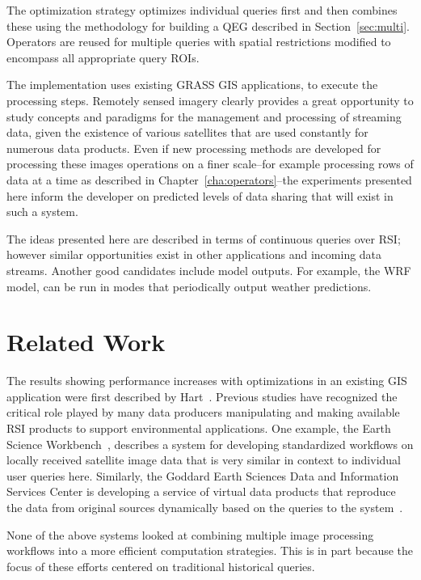 \documentclass{ucdthesis}       %
\begin{document}
The optimization strategy optimizes individual queries first and then
combines these using the methodology for building a \ac{QEG}
described in Section~\ref{sec:multi}.  Operators are reused for
multiple queries with spatial restrictions modified to encompass all
appropriate query \acp{ROI}.

The implementation uses existing \ac{GRASS} \ac{GIS} applications, to
execute the processing steps.  Remotely sensed imagery clearly
provides a great opportunity to study concepts and paradigms for the
management and processing of streaming data, given the existence of
various satellites that are used constantly for numerous data
products.  Even if new processing methods are developed for processing
these images operations on a finer scale--for example processing rows
of data at a time as described in Chapter~\ref{cha:operators}--the
experiments presented here inform the developer on predicted levels of
data sharing that will exist in such a system.

The ideas presented here are described in terms of continuous queries
over \ac{RSI}; however similar opportunities exist in other applications and
incoming data streams.  Another good candidates include model outputs.
For example, the \ac{WRF} model, can be run in modes that periodically
output weather predictions.

\section{Related Work}
\label{sec:related-gis}

The results showing performance increases with optimizations in an
existing \ac{GIS} application were first described by
Hart~\cite{hart06optim-of}.  Previous studies have recognized the
critical role played by many data producers manipulating and making
available \ac{RSI} products to support environmental applications.
One example, the Earth Science
Workbench~\cite{DBLP:conf/ssdbm/FrewB01}, describes a system for
developing standardized workflows on locally received satellite image
data that is very similar in context to individual user queries here.
Similarly, the Goddard Earth Sciences Data and Information Services
Center is developing a service of virtual data products that
reproduce the data from original sources dynamically based on the
queries to the system~\cite{DBLP:conf/ssdbm/LynnesV05}.

None of the above systems looked at combining multiple image
processing workflows into a more efficient computation strategies.
This is in part because the focus of these efforts centered on
traditional historical queries.
\end{document}

